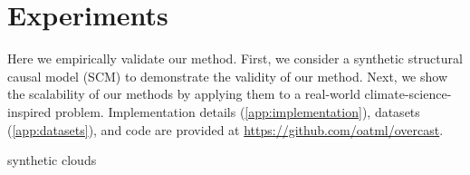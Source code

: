 \section{Experiments}
\label{sec:experiments}
Here we empirically validate our method.
First, we consider a synthetic structural causal model (SCM) to demonstrate the validity of our method.
Next, we show the scalability of our methods by applying them to a real-world climate-science-inspired problem.
Implementation details (\cref{app:implementation}), datasets (\cref{app:datasets}), and code are provided at 
\url{https://github.com/oatml/overcast}.

{synthetic}
{clouds}